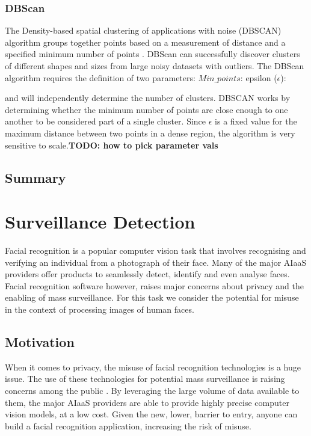 \documentclass[a4paper,12pt]{report}
\begin{document}
	\subsection{DBScan}
	\label{section:dbscan}
	The Density-based spatial clustering of applications with noise (DBSCAN) algorithm groups together points based on a measurement of distance and a specified minimum number of points \cite{ester1996density}. DBScan can successfully discover clusters of different shapes and sizes from large noisy datasets with outliers. The DBScan algorithm requires the definition of two parameters:
	$Min\_points$:
	epsilon ($\epsilon$): 
	
	and will independently determine the number of clusters. DBSCAN works by determining whether the minimum number of points are close enough to one another to be considered part of a single cluster. Since $\epsilon$ is a fixed value for the maximum distance between two points in a dense region, the algorithm is very sensitive to scale.\textbf{TODO: how to pick parameter vals}  %
	
	\section{Summary}
	
	
	\chapter{Surveillance Detection}
	Facial recognition is a popular computer vision task that involves recognising and verifying an individual from a photograph of their face. Many of the major AIaaS providers offer products to seamlessly detect, identify and even analyse faces. Facial recognition software however, raises major concerns about privacy and the enabling of mass surveillance. For this task we consider the potential for misuse in the context of processing images of human faces. 
	
	\section{Motivation}
	When it comes to privacy, the misuse of facial recognition technologies is a huge issue. The use of these technologies for potential mass surveillance is raising concerns among the public \cite{gates2011our}. By leveraging the large volume of data available to them, the major AIaaS providers are able to provide highly precise computer vision models, at a low cost. Given the new, lower, barrier to entry, anyone can build a facial recognition application, increasing the risk of misuse. 
	
\end{document}
